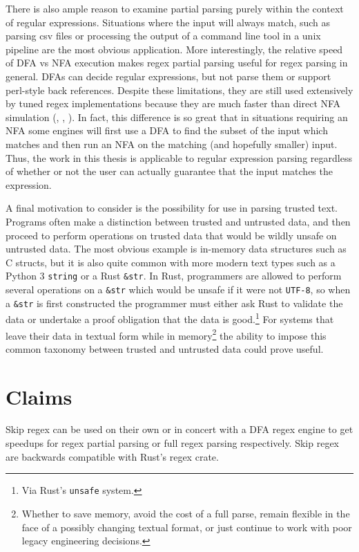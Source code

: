 There is also ample reason to examine partial parsing purely
within the context of regular expressions. Situations where the input
will always match, such as parsing csv files
or processing the output of a command line tool in a unix pipeline
are the most obvious application. More interestingly, the
relative speed of DFA vs NFA execution makes regex partial parsing
useful for regex parsing in general. DFAs can decide regular expressions,
but not parse them or support perl-style back references. Despite
these limitations, they are still used extensively by tuned regex
implementations because they are much faster than direct NFA
simulation (\cite{CoxRE2}, \cite{GallantRegex}, \cite{GoLang}).
In fact, this difference is so great that in situations requiring
an NFA some engines will first use a DFA to find the subset of the input
which matches and then run an NFA on the matching (and hopefully
smaller) input. Thus, the work in this thesis is applicable
to regular expression parsing regardless of whether or not the user
can actually guarantee that the input matches the expression.

A final motivation to consider is the possibility for use
in parsing trusted text. Programs often make a distinction between
trusted and untrusted data, and then proceed to perform operations
on trusted data that would be wildly unsafe on untrusted data.
The most obvious example is in-memory data structures such as C structs, but
it is also quite common with more modern text types such as
a Python 3 \verb'string' or a Rust \verb'&str'. In Rust, programmers
are allowed to perform several operations on a \verb'&str' which
would be unsafe if it were not \verb'UTF-8', so when a \verb'&str'
is first constructed the programmer must either ask Rust to validate
the data or undertake a proof obligation that the data is good.\footnote{
Via Rust's {\tt unsafe} system.} For systems that leave
their data in textual form while in memory\footnote{
Whether to save memory, avoid the cost of a full parse, remain
flexible in the face of a possibly changing textual format, or
just continue to work with poor legacy engineering decisions.}
the ability to impose this common taxonomy between trusted and
untrusted data could prove useful.

\section{Claims}

Skip regex can be used on their own or
in concert with a DFA regex engine to get speedups for
regex partial parsing or full regex parsing respectively.
Skip regex are backwards compatible with Rust's regex crate.


